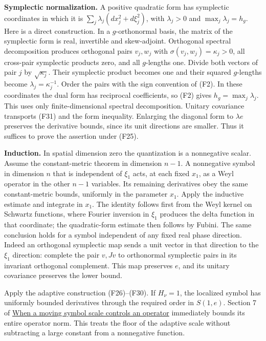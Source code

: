 \documentclass[
  11pt,
]{article}
\begin{document}
\textbf{Symplectic normalization.} A positive quadratic form has
symplectic coordinates in which it is
\(\sum_j\lambda_j(dx_j^2+d\xi_j^2)\), with \(\lambda_j>0\) and
\(\max_j\lambda_j=h_g\). Here is a direct construction. In a
\(g\)-orthonormal basis, the matrix of the symplectic form is real,
invertible and skew-adjoint. Orthogonal spectral decomposition produces
orthogonal pairs \(v_j,w_j\) with \(\sigma(v_j,w_j)=\kappa_j>0\), all
cross-pair symplectic products zero, and all \(g\)-lengths one. Divide
both vectors of pair \(j\) by \(\sqrt{\kappa_j}\). Their symplectic
product becomes one and their squared \(g\)-lengths become
\(\lambda_j=\kappa_j^{-1}\). Order the pairs with the sign convention of
(F2). In these coordinates the dual form has reciprocal coefficients, so
(F2) gives \(h_g=\max_j\lambda_j\). This uses only finite-dimensional
spectral decomposition. Unitary covariance transports (F31) and the form
inequality. Enlarging the diagonal form to \(\lambda e\) preserves the
derivative bounds, since its unit directions are smaller. Thus it
suffices to prove the assertion under (F25).

\textbf{Induction.} In spatial dimension zero the quantization is a
nonnegative scalar. Assume the constant-metric theorem in dimension
\(n-1\). A nonnegative symbol in dimension \(n\) that is independent of
\(\xi_1\) acts, at each fixed \(x_1\), as a Weyl operator in the other
\(n-1\) variables. Its remaining derivatives obey the same
constant-metric bounds, uniformly in the parameter \(x_1\). Apply the
inductive estimate and integrate in \(x_1\). The identity follows first
from the Weyl kernel on Schwartz functions, where Fourier inversion in
\(\xi_1\) produces the delta function in that coordinate; the
quadratic-form estimate then follows by Fubini. The same conclusion
holds for a symbol independent of any fixed real phase direction. Indeed
an orthogonal symplectic map sends a unit vector in that direction to
the \(\xi_1\) direction: complete the pair \(v,Jv\) to orthonormal
symplectic pairs in its invariant orthogonal complement. This map
preserves \(e\), and its unitary covariance preserves the lower bound.

Apply the adaptive construction (F26)--(F30). If \(H_\nu=1\), the
localized symbol has uniformly bounded derivatives through the required
order in \(S(1,e)\). Section 7 of \href{metric-operator-bounds.pdf}{When
a moving symbol scale controls an operator} immediately bounds its
entire operator norm. This treats the floor of the adaptive scale
without subtracting a large constant from a nonnegative function.
\end{document}
